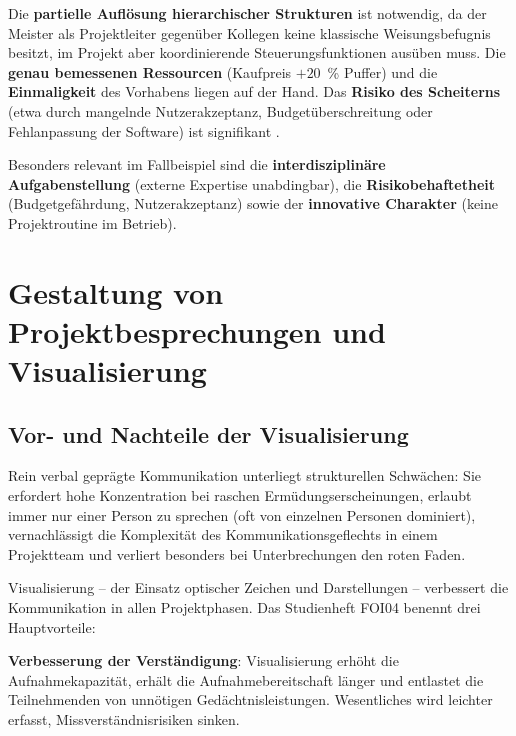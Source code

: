 \documentclass[
    a4paper,
    11pt,
    bibliography=totoc,
    listof=totoc,
    parskip=half,
    headings=normal
]{scrbook}
\begin{document}
Die \textbf{partielle Auflösung hierarchischer Strukturen} ist notwendig, da der
Meister als Projektleiter gegenüber Kollegen keine klassische Weisungsbefugnis
besitzt, im Projekt aber koordinierende Steuerungsfunktionen ausüben muss. Die
\textbf{genau bemessenen Ressourcen} (Kaufpreis $+20$~\% Puffer) und
die \textbf{Einmaligkeit} des Vorhabens liegen auf der Hand. Das \textbf{Risiko
      des Scheiterns} (etwa durch mangelnde Nutzerakzeptanz, Budgetüberschreitung oder
Fehlanpassung der Software) ist signifikant \autocite[vgl.][]{MittelstandDigital2019}.

Besonders relevant im Fallbeispiel sind die \textbf{interdisziplinäre
      Aufgabenstellung} (externe Expertise unabdingbar), die
\textbf{Risikobehaftetheit} (Budgetgefährdung, Nutzerakzeptanz) sowie der
\textbf{innovative Charakter} (keine Projektroutine im Betrieb).

\section{Gestaltung von Projektbesprechungen und Visualisierung}

\subsection{Vor- und Nachteile der Visualisierung}

Rein verbal geprägte Kommunikation unterliegt strukturellen Schwächen: Sie
erfordert hohe Konzentration bei raschen Ermüdungserscheinungen, erlaubt immer
nur einer Person zu sprechen (oft von einzelnen Personen dominiert), vernachlässigt
die Komplexität des Kommunikationsgeflechts in einem Projektteam und verliert
besonders bei Unterbrechungen den roten Faden\autocite[vgl.][Kap.~2]{Kiefer2010}.

Visualisierung -- der Einsatz optischer Zeichen und Darstellungen --
verbessert die Kommunikation in allen Projektphasen. Das Studienheft FOI04
benennt drei Hauptvorteile\autocite[vgl.][Kap.~2]{Kiefer2010}:

\textbf{Verbesserung der Verständigung}: Visualisierung erhöht die
Aufnahmekapazität, erhält die Aufnahmebereitschaft länger und entlastet die
Teilnehmenden von unnötigen Gedächtnisleistungen. Wesentliches wird leichter
erfasst, Missverständnisrisiken sinken.
\end{document}

